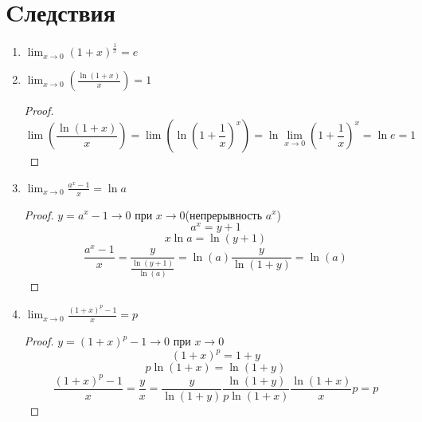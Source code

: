 ﻿\section{Cледствия}          
\begin{conseq}{}
\begin{enumerate}
 \item $\lim_{x \to 0}(1 + x)^{\frac1x} = e$
 \item $\lim_{x \to 0}(\frac{\ln(1 + x)}{x}) = 1$
 \begin{proof}
    $$\lim(\frac{\ln(1 + x)}x) =  \lim(\ln(1 + \frac1x)^x) = \ln \lim_{x \to 0}(1 + \frac1x)^x = \ln e = 1$$
 \end{proof}
 \item $\lim_{x \to 0}\frac{a^x - 1}{x} = \ln a$
 \begin{proof}
    $y = a^x - 1 \to 0$ при $x \to 0$(непрерывность $a^x$)
    $$a^x = y + 1$$
    $$x \ln a = \ln (y + 1) $$
    $$\frac{a^x - 1}{x} = \frac{y}{\frac{\ln(y+ 1)}{\ln(a)}} = \ln(a)\frac{y}{\ln(1 + y)} = \ln(a)$$
 \end{proof}
 \item $\lim_{x \to 0}\frac{(1 + x)^p - 1}{x} = p$
 \begin{proof}
     $y = (1 + x)^p - 1 \to 0$ при $x \to 0$
     $$(1 + x)^p = 1 + y$$
     $$p \ln(1 + x) = \ln(1 + y)$$
     $$\frac{(1 + x)^p - 1}{x} = \frac{y}{x} = \frac{y}{\ln(1 + y)}\frac{\ln(1 + y)}{p \ln(1 + x)}\frac{\ln(1 + x)}{x} p = p $$
 \end{proof}
\end{enumerate}
\end{conseq}